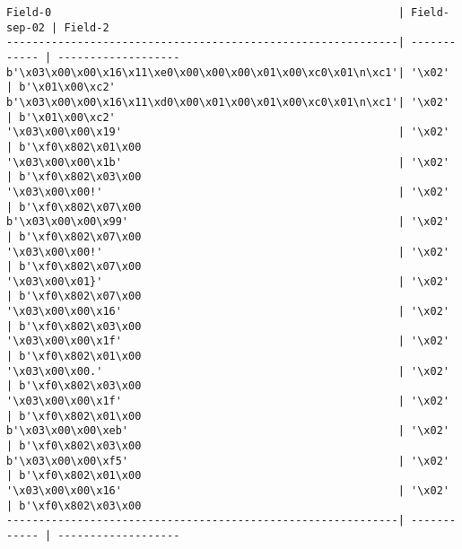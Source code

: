 \begin{verbatim}
Field-0                                                      | Field-sep-02 | Field-2            
-------------------------------------------------------------| ------------ | -------------------
b'\x03\x00\x00\x16\x11\xe0\x00\x00\x00\x01\x00\xc0\x01\n\xc1'| '\x02'       | b'\x01\x00\xc2'    
b'\x03\x00\x00\x16\x11\xd0\x00\x01\x00\x01\x00\xc0\x01\n\xc1'| '\x02'       | b'\x01\x00\xc2'    
'\x03\x00\x00\x19'                                           | '\x02'       | b'\xf0\x802\x01\x00
'\x03\x00\x00\x1b'                                           | '\x02'       | b'\xf0\x802\x03\x00
'\x03\x00\x00!'                                              | '\x02'       | b'\xf0\x802\x07\x00
b'\x03\x00\x00\x99'                                          | '\x02'       | b'\xf0\x802\x07\x00
'\x03\x00\x00!'                                              | '\x02'       | b'\xf0\x802\x07\x00
'\x03\x00\x01}'                                              | '\x02'       | b'\xf0\x802\x07\x00
'\x03\x00\x00\x16'                                           | '\x02'       | b'\xf0\x802\x03\x00
'\x03\x00\x00\x1f'                                           | '\x02'       | b'\xf0\x802\x01\x00
'\x03\x00\x00.'                                              | '\x02'       | b'\xf0\x802\x03\x00
'\x03\x00\x00\x1f'                                           | '\x02'       | b'\xf0\x802\x01\x00
b'\x03\x00\x00\xeb'                                          | '\x02'       | b'\xf0\x802\x03\x00
b'\x03\x00\x00\xf5'                                          | '\x02'       | b'\xf0\x802\x01\x00
'\x03\x00\x00\x16'                                           | '\x02'       | b'\xf0\x802\x03\x00
-------------------------------------------------------------| ------------ | -------------------
\end{verbatim}

